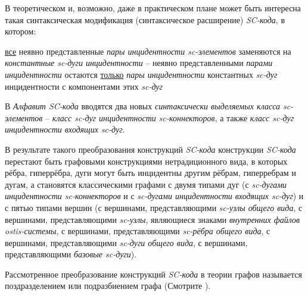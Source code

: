 \begin{SCn}
{В теоретическом и, возможно, даже в практическом плане может быть интересна такая синтаксическая модификация (синтаксическое расширение) \textit{SC-кода}, в котором: 
\begin{scnitemize}
\item \uline{все} неявно представленные \textit{пары инцидентности sc-элементов} заменяются на \textit{константные sc-дуги инцидентности} -- неявно представленными \textit{парами инцидентности} остаются \uline{только} \textit{пары инцидентности} константных \textit{sc-дуг} инцидентности с компонентами этих \textit{sc-дуг}
\item В \textit{Алфавит SC-кода} вводятся два новых \textit{синтаксически выделяемых класса sc-элементов} -- \textit{класс sc-дуг инцидентности sc-коннекторов}, а также \textit{класс sc-дуг инцидентности входящих sc-дуг}.
\end{scnitemize}

В результате такого преобразования конструкций \textit{SC-кода} конструкции \textit{SC-кода} перестают быть графовыми конструкциями нетрадиционного вида, в которых рёбра, гиперрёбра, дуги могут быть инцидентны другим рёбрам, гиперребрам и дугам, а становятся классическими графами с двумя типами дуг (с \textit{sc-дугами инцидентности sc-коннекторов} и с \textit{sc-дугами инцидентности входящих sc-дуг}) и с пятью типами вершин (с вершинами, представляющими \textit{sc-узлы общего вида}, с вершинами, представляющими \textit{sc-узлы}, являющиеся знаками \textit{внутренних файлов ostis-системы}, с вершинами, представляющими \textit{sc-рёбра общего вида}, с вершинами, представляющими \textit{sc-дуги общего вида}, с вершинами, представляющими \textit{базовые sc-дуги}).

Рассмотренное преобразование конструкций \textit{SC-кода} в теории графов называется поздразделением или подразбиением графа (Смотрите ).}

\bigskip
\scnendstruct {}

\bigskip
\scnendstruct \scnendcurrentsectioncomment

\end{SCn}

\label{sd_sc_code_syntax}

\label{sd_sc_code_semantic}